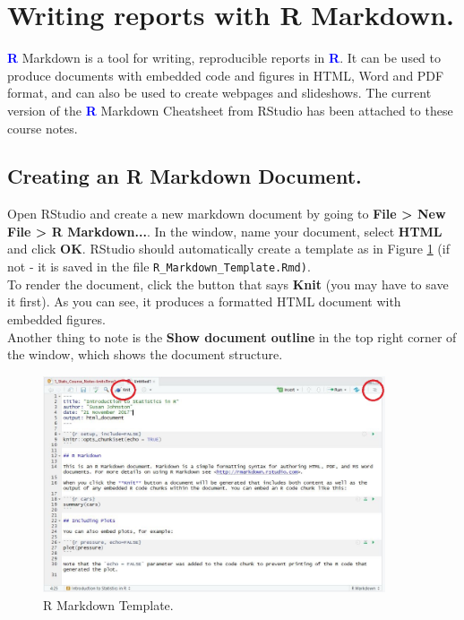 \documentclass[a4paper,12pt]{article}
\newcommand\boldblue[1]{\textcolor{blue}{\textbf{#1}}}
\begin{document}


\section {Writing reports with R Markdown.}


\boldblue{R} Markdown is a tool for writing, reproducible reports in \boldblue{R}. It can be used to produce documents with embedded code and figures in HTML, Word and PDF format, and can also be used to create webpages and slideshows. The current version of the \boldblue{R} Markdown Cheatsheet from RStudio has been attached to these course notes.

\subsection{Creating an R Markdown Document.}

Open RStudio and create a new markdown document by going to \textbf{File > New File > R Markdown...}. In the window, name your document, select \textbf{HTML} and click \textbf{OK}. RStudio should automatically create a template as in Figure \ref{fig:MarkdownTemplate} (if not - it is saved in the file \texttt{R\_Markdown\_Template.Rmd)}. \\

To render the document, click the button that says \textbf{Knit} (you may have to save it first). As you can see, it produces a formatted HTML document with embedded figures. \\

Another thing to note is the \textbf{Show document outline} in the top right corner of the window, which shows the document structure.

\begin{figure}[h]
	\centering 
	\includegraphics[width=0.9\textwidth]{figs/MarkdownTemplate.JPG}
	\caption{R Markdown Template.}
	\label{fig:MarkdownTemplate}
\end{figure} 
\end{document}
